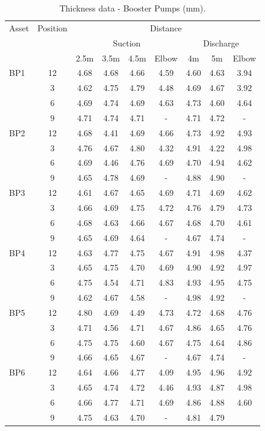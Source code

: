 \begin{table}[h]
	\caption{Thickness data - Booster Pumps (mm).}
	\label{ch04_tbl_thickness02}
	{\footnotesize
\begin{tabular}{l|c|c|c|c|c|c|c|c}
	\hline
	Asset & Position & \multicolumn{7}{c}{Distance} \\ 
	\cline{3-9}
	&  & \multicolumn{4}{c|}{Suction} & \multicolumn{3}{c}{Discharge} \\ 
	\cline{3-9}
	&  & 2.5m & 3.5m & 4.5m & Elbow & 4m & 5m & Elbow \\ 
	\hline
	BP1 & 12 & 4.68 & 4.68 & 4.66 & 4.59 & 4.60 & 4.63 & 3.94 \\ 
	& 3 & 4.62 & 4.75 & 4.79 & 4.48 & 4.69 & 4.67 & 3.92 \\ 
	& 6 & 4.69 & 4.74 & 4.69 & 4.63 & 4.73 & 4.60 & 4.64 \\ 
	& 9 & 4.71 & 4.74 & 4.71 & - & 4.71 & 4.72 & - \\ 
	\hline
	BP2 & 12 & 4.68 & 4.41 & 4.69 & 4.66 & 4.73 & 4.92 & 4.93 \\ 
	& 3 & 4.76 & 4.67 & 4.80 & 4.32 & 4.91 & 4.22 & 4.98 \\ 
	& 6 & 4.69 & 4.46 & 4.76 & 4.69 & 4.70 & 4.94 & 4.62 \\ 
	& 9 & 4.65 & 4.78 & 4.69 & - & 4.88 & 4.90 & - \\ 
	\hline
	BP3 & 12 & 4.61 & 4.67 & 4.65 & 4.69 & 4.71 & 4.69 & 4.62 \\ 
	& 3 & 4.66 & 4.69 & 4.75 & 4.72 & 4.76 & 4.79 & 4.73 \\ 
	& 6 & 4.68 & 4.63 & 4.66 & 4.67 & 4.68 & 4.70 & 4.61 \\ 
	& 9 & 4.65 & 4.69 & 4.64 & - & 4.67 & 4.74 & - \\ 
	\hline
	BP4 & 12 & 4.63 & 4.77 & 4.75 & 4.67 & 4.91 & 4.98 & 4.37 \\ 
	& 3 & 4.65 & 4.75 & 4.70 & 4.69 & 4.90 & 4.92 & 4.97 \\ 
	& 6 & 4.75 & 4.54 & 4.71 & 4.83 & 4.93 & 4.95 & 4.75 \\ 
	& 9 & 4.62 & 4.67 & 4.58 & - & 4.98 & 4.92 & - \\ 
	\hline
	BP5 & 12 & 4.80 & 4.69 & 4.49 & 4.73 & 4.72 & 4.68 & 4.76 \\ 
	& 3 & 4.71 & 4.56 & 4.71 & 4.67 & 4.86 & 4.65 & 4.76 \\ 
	& 6 & 4.75 & 4.75 & 4.60 & 4.67 & 4.75 & 4.64 & 4.86 \\ 
	& 9 & 4.66 & 4.65 & 4.67 & - & 4.67 & 4.74 & - \\ 
	\hline
	BP6 & 12 & 4.64 & 4.66 & 4.77 & 4.09 & 4.95 & 4.96 & 4.92 \\ 
	& 3 & 4.65 & 4.74 & 4.72 & 4.46 & 4.93 & 4.87 & 4.98 \\ 
	& 6 & 4.66 & 4.77 & 4.71 & 4.69 & 4.86 & 4.88 & 4.60 \\ 
	& 9 & 4.75 & 4.63 & 4.70 & - & 4.81 & 4.79 &  \\ 
	\hline
\end{tabular}

	}
\end{table}


